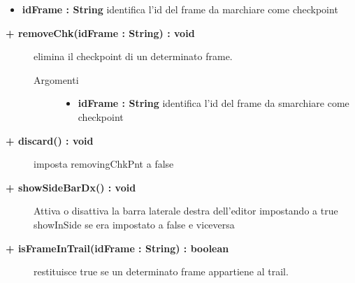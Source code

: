 \begin{description}
\begin{description}
\begin{description}
\begin{itemize}
					\item \textbf{idFrame : String			} \hfill
						identifica l'id del frame da marchiare come checkpoint
					
				\end{itemize}
		\end{description}
	\end{description}
	
	\begin{description}
		\item[\textbf{\color{blue}+ removeChk(idFrame : String) : void			}] \hfill
			elimina il checkpoint di un determinato frame.
			
		\begin{description}
			\item[Argomenti] \hfill
				\begin{itemize}
				
					\item \textbf{idFrame : String			} \hfill
						identifica l'id del frame da smarchiare come checkpoint
					
				\end{itemize}
		\end{description}
	\end{description}
	
	\begin{description}
		\item[\textbf{\color{blue}+ discard() : void			}] \hfill
			imposta removingChkPnt a false
	\end{description}
	
	\begin{description}
		\item[\textbf{\color{blue}+ showSideBarDx() : void			}] \hfill
			Attiva o disattiva la barra laterale destra dell’editor impostando a true
showInSide se era impostato a false e viceversa
			
	\end{description}
	
	\begin{description}
		\item[\textbf{\color{blue}+ isFrameInTrail(idFrame : String) : boolean			}] \hfill
			restituisce true se un determinato frame appartiene al trail.
			

\end{description}
\end{description}
